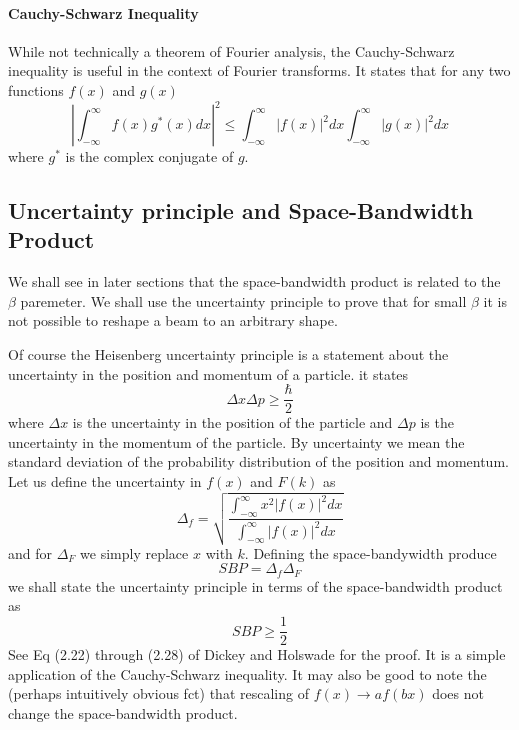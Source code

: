 \documentclass[../../main.tex]{subfiles} %
\begin{document}
\paragraph{Cauchy-Schwarz Inequality}
While not technically a theorem of Fourier analysis, the Cauchy-Schwarz inequality is useful in the context of Fourier transforms. It states that for any two functions $f(x)$ and $g(x)$
\begin{equation}
    \left|\int_{-\infty}^\infty f(x)g^*(x)dx\right|^2\leq\int_{-\infty}^\infty |f(x)|^2dx\int_{-\infty}^\infty |g(x)|^2dx
\end{equation}
where $g^*$ is the complex conjugate of $g$. 

\subsection{Uncertainty principle and Space-Bandwidth Product}
We shall see in later sections that the space-bandwidth product is related to the $\beta$ paremeter. We shall use the uncertainty principle to prove that for small $\beta$ it is not possible to reshape a beam to an arbitrary shape.

Of course the Heisenberg uncertainty principle is a statement about the uncertainty in the position and momentum of a particle. it states
\begin{equation}
    \Delta x\Delta p\geq \frac{\hbar}{2}
\end{equation}
where $\Delta x$ is the uncertainty in the position of the particle and $\Delta p$ is the uncertainty in the momentum of the particle. By uncertainty we mean the standard deviation of the probability distribution of the position and momentum. Let us define the uncertainty in $f(x)$ and $F(k)$ as
\begin{equation}
    \Delta_f=\sqrt{\frac{\int_{-\infty}^\infty x^2|f(x)|^2dx}{\int_{-\infty}^\infty |f(x)|^2dx}}
\end{equation}
and for $\Delta_F$ we simply replace $x$ with $k$. Defining the space-bandywidth produce 
\begin{equation}
    SBP=\Delta_f\Delta_F
\end{equation}
we shall state the uncertainty principle in terms of the space-bandwidth product as 
\begin{equation}
    SBP\geq \frac{1}{2}
\end{equation}
See Eq (2.22) through (2.28) of Dickey and Holswade for the proof. It is a simple application of the Cauchy-Schwarz inequality. It may also be good to note the (perhaps intuitively obvious fct) that rescaling of $f(x)\to af(bx)$  does not change the space-bandwidth product.
\end{document}
